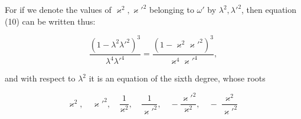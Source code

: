 
For if we denote the values of $\varkappa^2,\varkappa'^2$ belonging to $\omega'$ by $\lambda^2,\lambda'^2$, then equation (10) can be written thus:

\[
\frac{(1-\lambda^2\lambda'^2)^3}{\lambda^4\lambda'^4} = \frac{(1-\varkappa^2\varkappa'^2)^3}{\varkappa^4\varkappa'^4},
\]

and with respect to $\lambda^2$ it is an equation of the sixth degree, whose roots

\[
\varkappa^2, \quad \varkappa'^2, \quad \frac{1}{\varkappa^2}, \quad \frac{1}{\varkappa'^2}, \quad -\frac{\varkappa'^2}{\varkappa^2}, \quad -\frac{\varkappa^2}{\varkappa'^2}
\]
